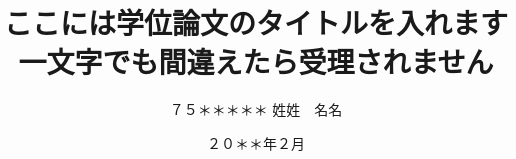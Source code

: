\documentclass[
    paper=a4paper,      %
    report,             %
    fleqn,              %
    fontsize=12pt,      %
    jafontsize=12pt,    %
    head_space=33mm,    %
    foot_space=30mm,    %
    gutter=25mm,        %
    fore-edge=10mm      %
    ]{jlreq}            %
\begin{document}


\title{ここには学位論文のタイトルを入れます \\ 一文字でも間違えたら受理されません}

\date{２０＊＊年２月}




\author{%
７５＊＊＊＊＊
\zw%
姓姓　名名
} %

\makecover

\tableofcontents



\clearpage
\pagestyle{normal}
\setcounter{page}{0}














\biblist





\end{document}
